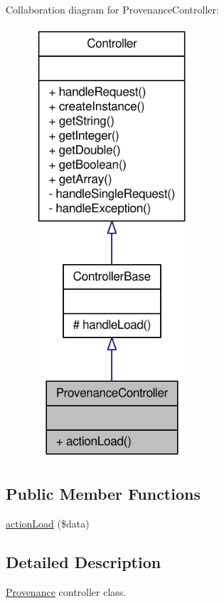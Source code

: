Collaboration diagram for ProvenanceController:\nopagebreak
\begin{figure}[H]
\begin{center}
\leavevmode
\includegraphics[width=164pt]{classProvenanceController__coll__graph}
\end{center}
\end{figure}
\subsection*{Public Member Functions}
\begin{DoxyCompactItemize}
\item 
\hyperlink{classProvenanceController_ad2de41e8a7cb3d641ec6fe6ecfc52278}{actionLoad} (\$data)
\end{DoxyCompactItemize}


\subsection{Detailed Description}
\hyperlink{classProvenance}{Provenance} controller class. 

